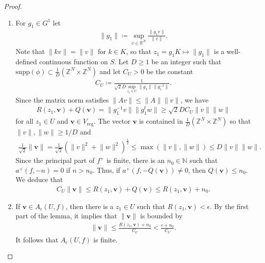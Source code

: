 \documentclass[10pt,a4paper]{amsart}
\newcommand{\NN}{\mathbb{N}}
\newcommand{\R}{\mathbb{R}}
\newcommand{\Z}{\mathbb{Z}}
\newcommand{\reg}{\mathrm{reg}}
\newcommand{\supp}{\mathrm{supp}}
\newcommand{\vbf}{\mathbf{v}}
\begin{document}
\begin{proof} \begin{enumerate} \item For $g_1 \in G^1$ let 
\begin{align}
\lVert g_1 \rVert \coloneqq \sup_{v \in \R^N} \frac{\lVert g_1v \rVert}{\lVert v \rVert}.
\end{align} Note that $\lVert kv \rVert=\lVert v \rVert$ for $k \in K$, so that $z_1=g_1 K \longmapsto \lVert g_1 \rVert$ is a well-defined continuous function on $S$. Let $D \geq 1$ be an integer such that $\supp(\phi) \subset \frac{1}{D} (\Z^N \times \Z^N)$ and let $C_U>0$ be the constant
\begin{align}
C_U \coloneqq \frac{1}{\sqrt{2}D \sup_{z_1 \in U} \lVert g_1 \rVert \lVert g_1^{-t} \rVert}.
\end{align}
Since the matrix norm satisfies $\lVert A v \rVert \leq \lVert A \rVert \lVert v \rVert$, we have
\begin{align}
R(z_1,\vbf)+Q(\vbf)=\lVert g_1^{-1}v \rVert \lVert g_1^tw \rVert \geq \sqrt{2}D C_U \lVert v \rVert\lVert w \rVert
\end{align} for all $z_1 \in U$ and $\vbf \in V_\reg$. The vector $\vbf$ is contained in $\frac{1}{D} (\Z^N \times \Z^N)$ so that $\lVert v \rVert,\lVert w \rVert \geq 1/D$ and
\begin{align}
 \frac{1}{\sqrt{2}} \lVert \vbf \rVert = \frac{1}{\sqrt{2}} \left (\lVert v \rVert^2+\lVert w \rVert^2 \right )^{\frac{1}{2}} \leq \max(\lVert v \rVert,\lVert w \rVert) \leq D \lVert v \rVert\lVert w \rVert.
\end{align}
Since the principal part of $f^+$ is finite, there is an $n_0 \in \NN$ such that $a^+(f,-n)=0$ if $n > n_0$. Thus, if $a^+(f,-Q(\vbf)) \neq 0$, then $Q(\vbf) \leq n_0$. We deduce that
\begin{align} \label{step in Lemma}
C_U\lVert \vbf \rVert \leq R(z_1,\vbf)+Q(\vbf) \leq R(z_1,\vbf)+n_0.
\end{align}

\item  If $\vbf \in A_\epsilon(U,f)$, then there is a $z_1 \in U$ such that $R(z_1,\vbf)<\epsilon$. By the first part of the lemma, it implies that $\lVert \vbf \rVert$ is bounded by
\begin{align}
\lVert \vbf \rVert \leq \frac{R(z_1,\vbf)+n_0}{C_U} < \frac{\epsilon+n_0}{C_U}.
\end{align} It follows that $A_\epsilon(U,f)$ is finite. 


\end{enumerate}
\end{proof}
\end{document}
